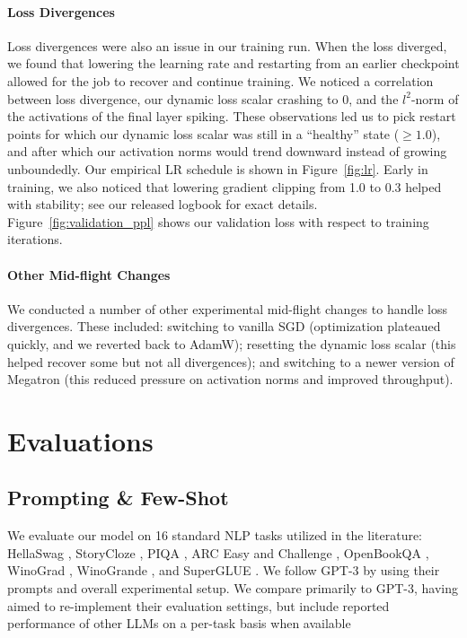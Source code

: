 \paragraph{Loss Divergences} Loss divergences were also an issue in our training run. When the loss diverged, we found that lowering the learning rate and restarting from an earlier checkpoint allowed for the job to recover and continue training.  We noticed a correlation between loss divergence, our dynamic loss scalar crashing to 0, and the $l^2$-norm of the activations of the final layer spiking. These observations led us to pick restart points for which our dynamic loss scalar was still in a ``healthy'' state ($\geq1.0$), and after which our activation norms would trend downward instead of growing unboundedly.  Our empirical LR schedule is shown in Figure~\ref{fig:lr}. Early in training, we also noticed that lowering gradient clipping from 1.0 to 0.3 helped with stability; see our released logbook for exact details.
Figure~\ref{fig:validation_ppl} shows our validation loss with respect to training iterations.

\paragraph{Other Mid-flight Changes} We conducted a number of other experimental mid-flight changes to handle loss divergences. These included: switching to vanilla SGD (optimization plateaued quickly, and we reverted back to AdamW); resetting the dynamic loss scalar (this helped recover some but not all divergences); and switching to a newer version of Megatron (this reduced pressure on activation norms and improved throughput).

\section{Evaluations}
\label{sec:main_results}

\subsection{Prompting \& Few-Shot}
\label{sec:prompt_and_fewshot}

We evaluate our model on 16 standard NLP tasks utilized in the literature: HellaSwag \cite{hellaswag}, StoryCloze \cite{storycloze}, PIQA \cite{bisk2020piqa}, ARC Easy and Challenge \cite{arc_challenge}, OpenBookQA \cite{openbookqa}, WinoGrad \cite{levesque2011winograd}, WinoGrande \cite{winogrande}, and SuperGLUE \cite{wang2019superglue}. We follow GPT-3 \cite{brown2020gpt3} by using their prompts and overall experimental setup. We compare primarily to GPT-3, having aimed to re-implement their  evaluation settings, but include reported performance of other LLMs on a per-task basis when available \cite{J1WhitePaper,gopher2022,chinchilla2022,eleutherai2022}


